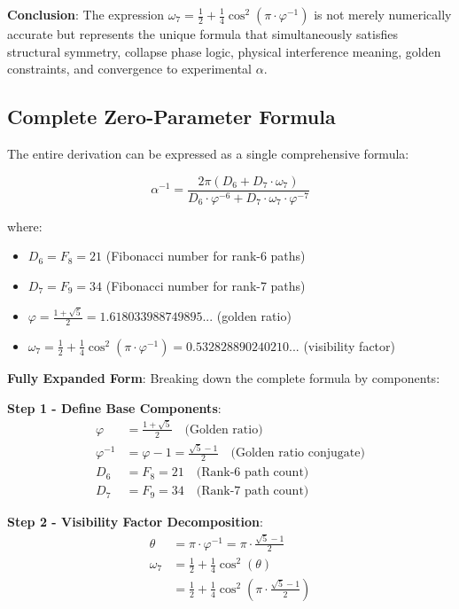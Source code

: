\documentclass[%
 reprint,
 amsmath,amssymb,
 aps,
 prd,
 10pt,
 nofootinbib,      %
 longbibliography  %
]{revtex4-2}
\theoremstyle{definition}
\theoremstyle{remark}
\begin{document}
\textbf{Conclusion}: The expression $\omega_7 = \frac{1}{2} + \frac{1}{4}\cos^2(\pi \cdot \varphi^{-1})$ is not merely numerically accurate but represents the unique formula that simultaneously satisfies structural symmetry, collapse phase logic, physical interference meaning, golden constraints, and convergence to experimental $\alpha$.

\subsection{Complete Zero-Parameter Formula}

The entire derivation can be expressed as a single comprehensive formula:

\begin{equation}
\boxed{
\alpha^{-1} = \frac{2\pi \left( D_6 + D_7 \cdot \omega_7 \right)}{D_6 \cdot \varphi^{-6} + D_7 \cdot \omega_7 \cdot \varphi^{-7}}
}
\end{equation}

where:
\begin{itemize}
\item $D_6 = F_8 = 21$ (Fibonacci number for rank-6 paths)
\item $D_7 = F_9 = 34$ (Fibonacci number for rank-7 paths)
\item $\varphi = \frac{1 + \sqrt{5}}{2} = 1.618033988749895...$ (golden ratio)
\item $\omega_7 = \frac{1}{2} + \frac{1}{4}\cos^2(\pi \cdot \varphi^{-1}) = 0.532828890240210...$ (visibility factor)
\end{itemize}

\textbf{Fully Expanded Form}: Breaking down the complete formula by components:

\textbf{Step 1 - Define Base Components}:
\begin{align}
\varphi &= \frac{1+\sqrt{5}}{2} \quad \text{(Golden ratio)} \\
\varphi^{-1} &= \varphi - 1 = \frac{\sqrt{5}-1}{2} \quad \text{(Golden ratio conjugate)} \\
D_6 &= F_8 = 21 \quad \text{(Rank-6 path count)} \\
D_7 &= F_9 = 34 \quad \text{(Rank-7 path count)}
\end{align}

\textbf{Step 2 - Visibility Factor Decomposition}:
\begin{align}
\theta &= \pi \cdot \varphi^{-1} = \pi \cdot \frac{\sqrt{5}-1}{2} \\
\omega_7 &= \frac{1}{2} + \frac{1}{4}\cos^2(\theta) \\
&= \frac{1}{2} + \frac{1}{4}\cos^2\left(\pi \cdot \frac{\sqrt{5}-1}{2}\right)
\end{align}
\end{document}
